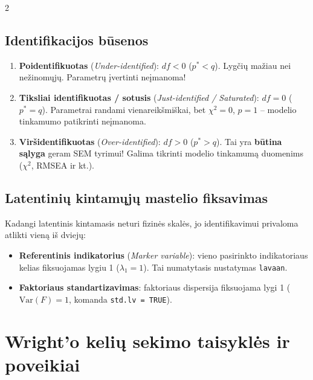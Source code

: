 \documentclass[9pt,a4paper]{article}
\begin{document}
\begin{multicols*}{2}
\subsection{Identifikacijos būsenos}
\begin{enumerate}
    \item \textbf{Poidentifikuotas} (\textit{Under-identified}): $df < 0$ ($p^* < q$). Lygčių mažiau nei nežinomųjų. Parametrų įvertinti neįmanoma!
    \item \textbf{Tiksliai identifikuotas / sotusis} (\textit{Just-identified / Saturated}): $df = 0$ ($p^* = q$). Parametrai randami vienareikšmiškai, bet $\chi^2 = 0$, $p = 1$ -- modelio tinkamumo patikrinti neįmanoma.
    \item \textbf{Viršidentifikuotas} (\textit{Over-identified}): $df > 0$ ($p^* > q$). Tai yra \textbf{būtina sąlyga} geram SEM tyrimui! Galima tikrinti modelio tinkamumą duomenims ($\chi^2$, RMSEA ir kt.).
\end{enumerate}

\subsection{Latentinių kintamųjų mastelio fiksavimas}
Kadangi latentinis kintamasis neturi fizinės skalės, jo identifikavimui privaloma atlikti vieną iš dviejų:
\begin{itemize}
    \item \textbf{Referentinis indikatorius} (\textit{Marker variable}): vieno pasirinkto indikatoriaus kelias fiksuojamas lygiu 1 ($\lambda_1 = 1$). Tai numatytasis nustatymas \texttt{lavaan}.
    \item \textbf{Faktoriaus standartizavimas}: faktoriaus dispersija fiksuojama lygi 1 ($\text{Var}(F) = 1$, komanda \texttt{std.lv = TRUE}).
\end{itemize}

\section{Wright'o kelių sekimo taisyklės ir poveikiai}


\end{multicols*}
\end{document}
